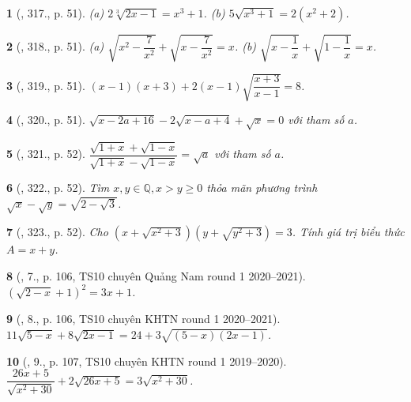 \documentclass{article}
\newtheorem{baitoan}{}
\begin{document}
\begin{baitoan}[\cite{Binh_Toan_9_tap_2}, 317., p. 51]
	(a) $2\sqrt[3]{2x - 1} = x^3 + 1$. (b) $5\sqrt{x^3 + 1} = 2(x^2 + 2)$.
\end{baitoan}

\begin{baitoan}[\cite{Binh_Toan_9_tap_2}, 318., p. 51]
	(a) $\sqrt{x^2 - \dfrac{7}{x^2}} + \sqrt{x - \dfrac{7}{x^2}} = x$. (b) $\sqrt{x - \dfrac{1}{x}} + \sqrt{1 - \dfrac{1}{x}} = x$.
\end{baitoan}

\begin{baitoan}[\cite{Binh_Toan_9_tap_2}, 319., p. 51]
	$(x - 1)(x + 3) + 2(x - 1)\sqrt{\dfrac{x + 3}{x - 1}} = 8$.
\end{baitoan}

\begin{baitoan}[\cite{Binh_Toan_9_tap_2}, 320., p. 51]
	$\sqrt{x - 2a + 16} - 2\sqrt{x - a + 4} + \sqrt{x} = 0$ với tham số $a$.
\end{baitoan}

\begin{baitoan}[\cite{Binh_Toan_9_tap_2}, 321., p. 52]
	$\dfrac{\sqrt{1 + x} + \sqrt{1 - x}}{\sqrt{1 + x} - \sqrt{1 - x}} = \sqrt{a}$ với tham số $a$.
\end{baitoan}

\begin{baitoan}[\cite{Binh_Toan_9_tap_2}, 322., p. 52]
	Tìm $x,y\in\mathbb{Q},x > y\ge0$ thỏa mãn phương trình $\sqrt{x} - \sqrt{y} = \sqrt{2 - \sqrt{3}}$.
\end{baitoan}

\begin{baitoan}[\cite{Binh_Toan_9_tap_2}, 323., p. 52]
	Cho $\left(x + \sqrt{x^2 + 3}\right)\left(y + \sqrt{y^2 + 3}\right) = 3$. Tính giá trị biểu thức $A = x + y$.
\end{baitoan}

\begin{baitoan}[\cite{Lam_An_Tuan_Toan_9_dai_so}, 7., p. 106, TS10 chuyên Quảng Nam round 1 2020--2021]
	$(\sqrt{2 - x} + 1)^2 = 3x + 1$.
\end{baitoan}

\begin{baitoan}[\cite{Lam_An_Tuan_Toan_9_dai_so}, 8., p. 106, TS10 chuyên KHTN round 1 2020--2021]
	$11\sqrt{5 - x} + 8\sqrt{2x - 1} = 24 + 3\sqrt{(5 - x)(2x - 1)}$.
\end{baitoan}

\begin{baitoan}[\cite{Lam_An_Tuan_Toan_9_dai_so}, 9., p. 107, TS10 chuyên KHTN round 1 2019--2020]
	$\dfrac{26x + 5}{\sqrt{x^2 + 30}} + 2\sqrt{26x + 5} = 3\sqrt{x^2 + 30}$.
\end{baitoan}
\end{document}
